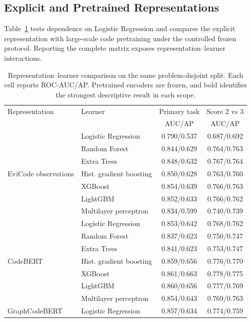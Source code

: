 \documentclass[conference]{IEEEtran}
\begin{document}
\subsection{Explicit and Pretrained Representations}
\label{sec:representation-ablation}
Table~\ref{tab:representation-capacity} tests dependence on Logistic Regression and compares the explicit representation with large-scale code pretraining under the controlled frozen protocol. Reporting the complete matrix exposes representation--learner interactions.

\begin{table}[!t]
\centering
\caption{Representation--learner comparison on the same problem-disjoint split. Each cell reports ROC-AUC/AP. Pretrained encoders are frozen, and bold identifies the strongest descriptive result in each scope.}
\label{tab:representation-capacity}
\fontsize{7.0}{7.6}\selectfont
\renewcommand{\arraystretch}{0.88}
\setlength{\tabcolsep}{2.5pt}
\begin{tabular}{@{}llcc@{}}
\toprule
Representation & Learner & Primary task & Score 2 vs 3 \\
 & & AUC/AP & AUC/AP \\
\midrule
\multirow{7}{*}{EviCode observations}
 & Logistic Regression & 0.790/0.537 & 0.687/0.692 \\
 & Random Forest & 0.844/0.629 & 0.764/0.763 \\
 & Extra Trees & 0.848/0.632 & 0.767/0.764 \\
 & Hist. gradient boosting & 0.850/0.628 & 0.763/0.760 \\
 & XGBoost & 0.854/0.639 & 0.766/0.763 \\
 & LightGBM & 0.852/0.633 & 0.766/0.762 \\
 & Multilayer perceptron & 0.834/0.599 & 0.740/0.739 \\
\midrule
\multirow{7}{*}{CodeBERT}
 & Logistic Regression & 0.853/0.642 & 0.768/0.762 \\
 & Random Forest & 0.837/0.623 & 0.750/0.747 \\
 & Extra Trees & 0.841/0.623 & 0.753/0.747 \\
 & Hist. gradient boosting & 0.859/0.656 & 0.776/0.770 \\
 & XGBoost & 0.861/0.663 & 0.778/0.775 \\
 & LightGBM & 0.860/0.656 & 0.777/0.769 \\
 & Multilayer perceptron & 0.854/0.643 & 0.769/0.763 \\
\midrule
\multirow{7}{*}{GraphCodeBERT}
 & Logistic Regression & 0.857/0.634 & 0.774/0.759 \\

\end{tabular}
\end{table}
\end{document}
